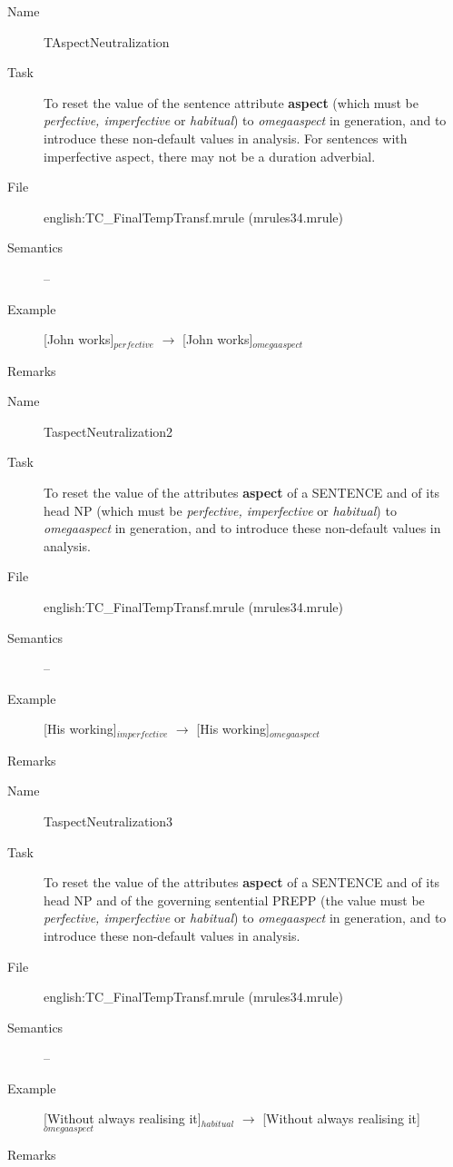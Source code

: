 \begin{description}
\vspace{1 cm}
\begin{description}
\item[Name] TAspectNeutralization
\item[Task] To reset the value of the sentence attribute {\bf aspect} 
(which must be 
{\em perfective, imperfective\/} or {\em habitual\/}) to {\em omegaaspect\/} 
in generation, and to introduce these non-default values in analysis. For 
sentences with imperfective aspect, there may not be a duration adverbial.
\item[File] english:TC\_FinalTempTransf.mrule (mrules34.mrule)
\item[Semantics] --
\item[Example] [John works]$_{perfective}$ $\rightarrow$ [John works]$_
{omegaaspect}$
\item[Remarks]
\end{description}

\vspace{1 cm}
\begin{description}
\item[Name] TaspectNeutralization2
\item[Task] To reset the value of the attributes {\bf aspect} of a SENTENCE and 
of its head NP (which must be 
{\em perfective, imperfective\/} or {\em habitual\/}) to {\em omegaaspect\/} 
in generation, and to introduce these non-default values in analysis.
\item[File] english:TC\_FinalTempTransf.mrule (mrules34.mrule)
\item[Semantics] --
\item[Example] [His working]$_{imperfective}$ $\rightarrow$ [His working]$_
{omegaaspect}$
\item[Remarks]
\end{description}

\vspace{1 cm}
\begin{description}
\item[Name] TaspectNeutralization3
\item[Task] To reset the value of the attributes {\bf aspect} of a SENTENCE and 
of its head NP and of the governing sentential PREPP (the value must be 
{\em perfective, imperfective\/} or {\em habitual\/}) to {\em omegaaspect\/} 
in generation, and to introduce these non-default values in analysis.
\item[File] english:TC\_FinalTempTransf.mrule (mrules34.mrule)
\item[Semantics] --
\item[Example] [Without always realising it]$_{habitual}$ $\rightarrow$ 
[Without always realising it]$_{omegaaspect}$
\item[Remarks]
\end{description}


\end{description}
